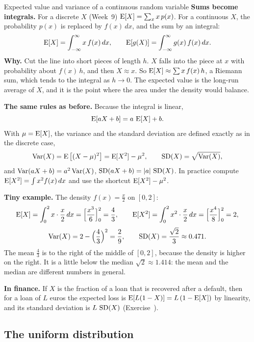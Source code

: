 \begin{key}{Expected value and variance of a continuous random variable}
	\setlength{\parskip}{5pt}
	\textbf{Sums become integrals.} For a discrete $X$ (Week~9)
	$\operatorname{E}[X]=\sum_x x\,p(x)$. For a continuous $X$, the probability
	$p(x)$ is replaced by $f(x)\,dx$, and the sum by an integral:
	\[ \operatorname{E}[X]=\int_{-\infty}^{\infty}x\,f(x)\,dx,\qquad
		\operatorname{E}[g(X)]=\int_{-\infty}^{\infty}g(x)\,f(x)\,dx. \]
	\textbf{Why.} Cut the line into short pieces of length $h$. $X$ falls into
	the piece at $x$ with probability about $f(x)\,h$, and then $X\approx x$.
	So $\operatorname{E}[X]\approx\sum x\,f(x)\,h$, a Riemann sum, which tends to the
	integral as $h\to0$. The expected value is the long-run average of $X$,
	and it is the point where the area under the density would balance.

	\textbf{The same rules as before.} Because the integral is linear,
	\[ \operatorname{E}[aX+b]=a\,\operatorname{E}[X]+b. \]
	With $\mu=\operatorname{E}[X]$, the variance and the standard deviation are defined
	exactly as in the discrete case,
	\[ \operatorname{Var}(X)=\operatorname{E}\big[(X-\mu)^2\big]=\operatorname{E}[X^2]-\mu^2,\qquad
		\operatorname{SD}(X)=\sqrt{\operatorname{Var}(X)}, \]
	and $\operatorname{Var}(aX+b)=a^2\operatorname{Var}(X)$, $\operatorname{SD}(aX+b)=|a|\,\operatorname{SD}(X)$. In practice compute
	$\operatorname{E}[X^2]=\int x^2f(x)\,dx$ and use the shortcut $\operatorname{E}[X^2]-\mu^2$.

	\textbf{Tiny example.} The density $f(x)=\frac x2$ on $[0,2]$:
	\[ \operatorname{E}[X]=\int_0^2x\cdot\frac x2\,dx=\Big[\frac{x^3}{6}\Big]_0^2=\frac43,
		\qquad \operatorname{E}[X^2]=\int_0^2x^2\cdot\frac x2\,dx=\Big[\frac{x^4}{8}\Big]_0^2=2, \]
	\[ \operatorname{Var}(X)=2-\Big(\frac43\Big)^2=\frac29,\qquad
		\operatorname{SD}(X)=\frac{\sqrt2}{3}\approx0.471. \]
	The mean $\frac43$ is to the right of the middle of $[0,2]$, because the
	density is higher on the right. It is a little below the median
	$\sqrt2\approx1.414$: the mean and the median are different numbers in
	general.

	\textbf{In finance.} If $X$ is the fraction of a loan that is recovered
	after a default, then for a loan of $L$ euros the expected loss is
	$\operatorname{E}[L(1-X)]=L\,(1-\operatorname{E}[X])$ by linearity, and its standard deviation is
	$L\,\operatorname{SD}(X)$ (Exercise~).
\end{key}


\subsection*{The uniform distribution}


